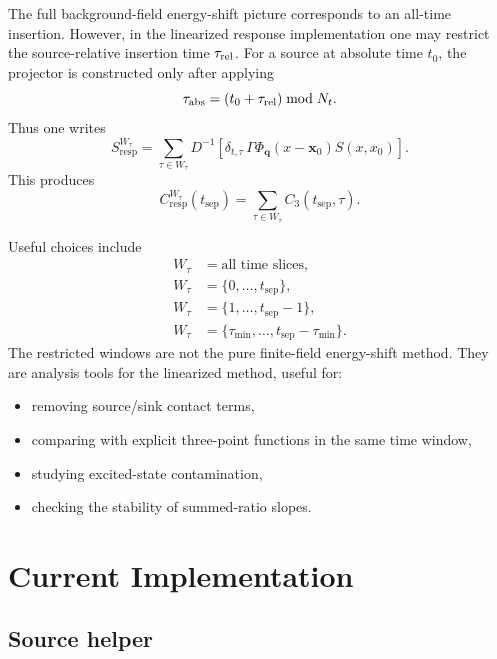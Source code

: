 \documentclass[11pt,a4paper]{article}
\newcommand{\Dslash}{D}
\newcommand{\Sresp}{S_{\mathrm{resp}}}
\newcommand{\Cthree}{C_3}
\newcommand{\Cresp}{C_{\mathrm{resp}}}
\begin{document}
The full background-field energy-shift picture corresponds to an all-time
insertion.  However, in the linearized response implementation one may restrict
the source-relative insertion time \(\tau_{\rm rel}\).  For a source at
absolute time \(t_0\), the projector is constructed only after applying
\begin{equation}
  \tau_{\rm abs}=(t_0+\tau_{\rm rel})\bmod N_t .
\end{equation}
Thus one writes
\begin{equation}
  \Sresp^{W_\tau}
  =
  \sum_{\tau\in W_\tau}
  \Dslash^{-1}
  \left[
    \delta_{t,\tau}\,
    \Gamma\Phi_{\mathbf q}(x-\mathbf x_0)S(x,x_0)
  \right].
\end{equation}
This produces
\begin{equation}
  \Cresp^{W_\tau}(t_{\mathrm{sep}})
  =
  \sum_{\tau\in W_\tau}
  \Cthree(t_{\mathrm{sep}},\tau).
\end{equation}

Useful choices include
\begin{align}
  W_\tau &= \text{all time slices},\\
  W_\tau &= \{0,\ldots,t_{\mathrm{sep}}\},\\
  W_\tau &= \{1,\ldots,t_{\mathrm{sep}}-1\},\\
  W_\tau &= \{\tau_{\min},\ldots,t_{\mathrm{sep}}-\tau_{\min}\}.
\end{align}
The restricted windows are not the pure finite-field energy-shift method.
They are analysis tools for the linearized method, useful for:
\begin{itemize}
  \item removing source/sink contact terms,
  \item comparing with explicit three-point functions in the same time window,
  \item studying excited-state contamination,
  \item checking the stability of summed-ratio slopes.
\end{itemize}

\section{Current Implementation}

\subsection{Source helper}
\end{document}
